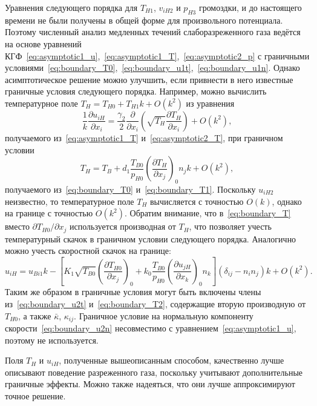 \documentclass[
aps,%
12pt,%
final,%
notitlepage,%
oneside,%
onecolumn,%
nobibnotes,%
nofootinbib,%
superscriptaddress,%
noshowpacs,%
showkeys,%
floatfix,%
tightenlines,%
centertags]%
{revtex4}
\newcommand{\pder}[2][]{\frac{\partial#1}{\partial#2}}
\newcommand{\Pder}[2][]{\partial#1/\partial#2}
\newcommand{\OO}[1]{O(#1)}
\newcommand{\onwall}[1]{\left(#1\right)_0}
\begin{document}
Уравнения следующего порядка для \(T_{H1}\), \(v_{iH2}\) и \(p_{H3}\) громоздки,
и до настоящего времени не были получены в общей форме для произвольного потенциала.
Поэтому численный анализ медленных течений слаборазреженного газа ведётся
на основе уравнений КГФ~\eqref{eq:asymptotic1_u},~\eqref{eq:asymptotic1_T},~\eqref{eq:asymptotic2_p}
с граничными условиями~\eqref{eq:boundary_T0},~\eqref{eq:boundary_u1t},~\eqref{eq:boundary_u1n}.
Однако асимптотическое решение можно улучшить,
если привнести в него известные граничные условия следующего порядка.
Например, можно вычислить температурное поле \(T_H = T_{H0} + T_{H1}k + \OO{k^2}\) из уравнения
\begin{equation}\label{eq:asymptotic_T}
    \frac1k\pder[u_{iH}]{x_i} = \frac{\gamma_2}2\pder{x_i}\left(\sqrt{T_H}\pder[T_H]{x_i}\right) + \OO{k^2},
\end{equation}
получаемого из~\eqref{eq:asymptotic1_T} и~\eqref{eq:asymptotic2_T},
при граничном условии
\begin{equation}\label{eq:boundary_T}
    T_H = T_B + d_1\frac{T_{B0}}{p_{H0}}\onwall{\pder[T_H]{x_j}}n_j k + \OO{k^2},
\end{equation}
получаемого из~\eqref{eq:boundary_T0} и~\eqref{eq:boundary_T1}.
Поскольку \(u_{iH2}\) неизвестно, то температурное поле \(T_H\) вычисляется с точностью \(\OO{k}\),
однако на границе с точностью \(\OO{k^2}\).
Обратим внимание, что в~\eqref{eq:boundary_T} вместо \(\Pder[T_{H0}]{x_j}\) используется производная от \(T_H\),
что позволяет учесть температурный скачок в граничном условии следующего порядка.
Аналогично можно учесть скоростной скачок на границе:
\begin{equation}\label{eq:boundary_u}
    u_{iH} = u_{Bi1}k - \left[ K_1\sqrt{T_{B0}}\onwall{\pder[T_{H0}]{x_j}}
        + k_0\frac{T_{B0}}{p_{H0}}\onwall{\pder[u_{jH}]{x_k}}n_k \right] (\delta_{ij}-n_i n_j)k + \OO{k^2}.
\end{equation}
Таким же образом в граничные условия могут быть включены члены из~\eqref{eq:boundary_u2t} и~\eqref{eq:boundary_T2},
содержащие вторую производную от \(T_{H0}\), а также \(\bar\kappa\), \(\kappa_{ij}\).
Граничное условие на нормальную компоненту скорости~\eqref{eq:boundary_u2n}
несовместимо с уравнением~\eqref{eq:asymptotic1_u}, поэтому не используется.

Поля \(T_H\) и \(u_{iH}\), полученные вышеописанным способом,
качественно лучше описывают поведение разреженного газа,
поскольку учитывают дополнительные граничные эффекты.
Можно также надеяться, что они лучше аппроксимируют точное решение.
\end{document}
